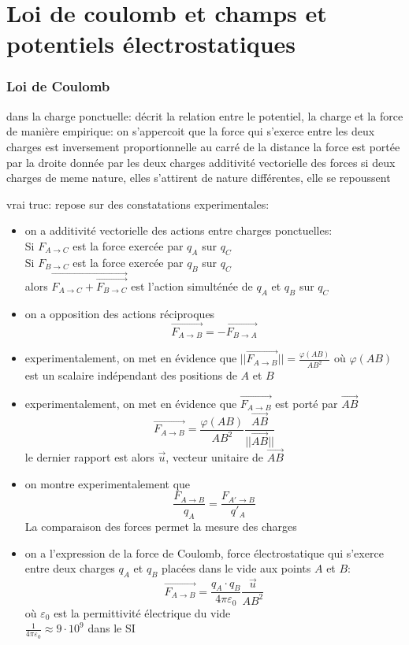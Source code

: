 \documentclass[../main.tex]{subfile}
\begin{document}
\part{Loi de coulomb et champs et potentiels électrostatiques}
\section{Loi de Coulomb}
dans la charge ponctuelle:
décrit la relation entre le potentiel, la charge et la force
de manière empirique: on s'appercoit que 
la force qui s'exerce entre les deux charges est inversement proportionnelle au carré de la distance
la force est portée par la droite donnée par les deux charges
additivité vectorielle des forces
si deux charges de meme nature, elles s'attirent
de nature différentes, elle se repoussent

vrai truc:
repose sur des constatations experimentales:
\begin{itemize}
	\item on a additivité vectorielle des actions entre charges ponctuelles:\\
	Si $F_{A \to C}$ est la force exercée par $q_A$ sur $q_C$\\
	Si $F_{B \to C}$ est la force exercée par $q_B$ sur $q_C$\\
	alors $\vec{F_{A \to C} + \vec{F_{B \to C}}}$ est l'action simulténée de $q_A$ et $q_B$ sur $q_C$
	\item on a opposition des actions réciproques
	$$\vec{F_{A \to B}} = -\vec{F_{B \to A}}$$
	\item experimentalement, on met en évidence que $||\vec{F_{A \to B}}|| = \frac{\varphi(AB)}{AB^2}$ où $\varphi(AB)$ est un scalaire indépendant des positions de $A$ et $B$
	\item experimentalement, on met en évidence que $\vec{F_{A \to B}}$ est porté par $\vec{AB}$
	$$\vec{F_{A \to B}} = \frac{\varphi(AB)}{AB^2} \frac{\vec{AB}}{||\vec{AB}||}$$
	le dernier rapport est alors $\vec{u}$, vecteur unitaire de $\vec{AB}$
	\item on montre experimentalement que 
	$$\frac{F_{A \to B}}{q_A} = \frac{F_{A' \to B}}{q'_A}$$
	La comparaison des forces permet la mesure des charges
	\item on a l'expression de la force de Coulomb, force électrostatique qui s'exerce entre deux charges $q_A$ et $q_B$ placées dans le vide aux points $A$ et $B$:
	$$\vec{F_{A \to B}} = \frac{q_A \cdot q_B}{4 \pi \varepsilon_0} \frac{\vec{u}}{AB^2}$$
	où $\varepsilon_0$ est la permittivité électrique du vide\\
	$\frac{1}{4 \pi \varepsilon_0} \approx 9\cdot 10^9$ dans le SI
\end{itemize}
\end{document}
